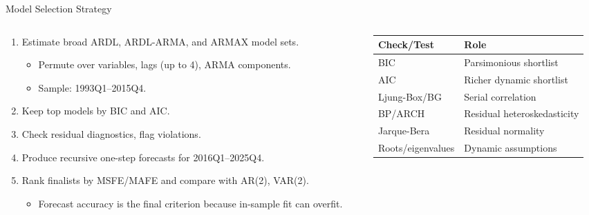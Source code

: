 \documentclass[aspectratio=169,10pt]{beamer}
\begin{document}
\begin{frame}{Model Selection Strategy}
\small
\begin{columns}[onlytextwidth]
\begin{column}{0.55\textwidth}
\begin{enumerate}
    \item Estimate broad ARDL, ARDL-ARMA, and ARMAX model sets.
    \begin{itemize}
        \item Permute over variables, lags (up to 4), ARMA components.
        \item Sample: 1993Q1--2015Q4.
    \end{itemize}
    \item Keep top models by BIC and AIC.
    \item Check residual diagnostics, flag violations.
    \item Produce recursive one-step forecasts for 2016Q1--2025Q4.
    \item Rank finalists by MSFE/MAFE and compare with AR(2), VAR(2).
    \begin{itemize}
        \item Forecast accuracy is the final criterion because in-sample fit can overfit.
    \end{itemize}
\end{enumerate}
\end{column}
\begin{column}{0.45\textwidth}
\centering
\begin{tabular}{ll}
\toprule
Check/Test & Role \\
\midrule
BIC & Parsimonious shortlist \\
AIC & Richer dynamic shortlist \\
Ljung-Box/BG & Serial correlation \\
BP/ARCH & Residual heteroskedasticity \\
Jarque-Bera & Residual normality \\
Roots/eigenvalues & Dynamic assumptions \\
\bottomrule
\end{tabular}
\end{column}
\end{columns}
\end{frame}
\end{document}
